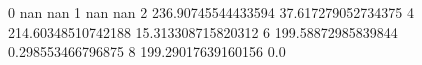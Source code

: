 0 nan nan
1 nan nan
2 236.90745544433594 37.617279052734375
4 214.60348510742188 15.313308715820312
6 199.58872985839844 0.298553466796875
8 199.29017639160156 0.0
